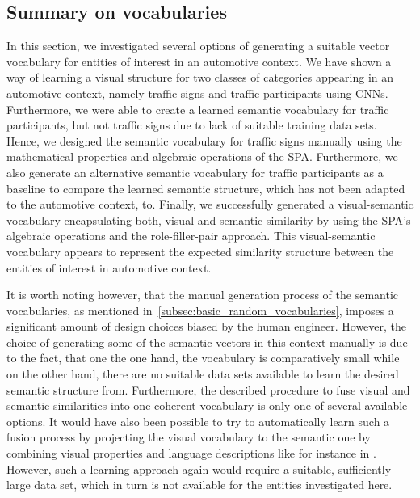 \subsection{Summary on vocabularies}%
\label{subsec:summary_on_vocabularies}

In this section, we investigated several options of generating a suitable vector vocabulary for entities of interest in an automotive context.
We have shown a way of learning a visual structure for two classes of categories appearing in an automotive context, namely traffic signs and traffic participants using \acp{CNN}.
Furthermore, we were able to create a learned semantic vocabulary for traffic participants, but not traffic signs due to lack of suitable training data sets.
Hence, we designed the semantic vocabulary for traffic signs manually using the mathematical properties and algebraic operations of the \ac{SPA}.
Furthermore, we also generate an alternative semantic vocabulary for traffic participants as a baseline to compare the learned semantic structure, which has not been adapted to the automotive context, to.
Finally, we successfully generated a visual-semantic vocabulary encapsulating both, visual and semantic similarity by using the \ac{SPA}'s algebraic operations and the role-filler-pair approach.
This visual-semantic vocabulary appears to represent the expected similarity structure between the entities of interest in automotive context.

It is worth noting however, that the manual generation process of the semantic vocabularies, as mentioned in~\ref{subsec:basic_random_vocabularies}, imposes a significant amount of design choices biased by the human engineer.
However, the choice of generating some of the semantic vectors in this context manually is due to the fact, that one the one hand, the vocabulary is comparatively small while on the other hand, there are no suitable data sets available to learn the desired semantic structure from.
Furthermore, the described procedure to fuse visual and semantic similarities into one coherent vocabulary is only one of several available options.
It would have also been possible to try to automatically learn such a fusion process by projecting the visual vocabulary to the semantic one by combining visual properties and language descriptions like for instance in \cite{Karpathy2017}.
However, such a learning approach again would require a suitable, sufficiently large data set, which in turn is not available for the entities investigated here.

